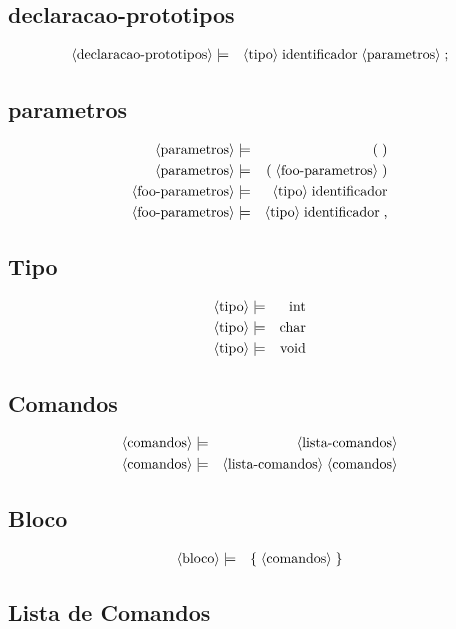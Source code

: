 \documentclass[12pt,a4papper]{article}
\newcommand{\pn}[1]{\langle \textnormal{#1} \rangle}
\newcommand{\pp}{\models}
\newcommand{\ww}{\;}
\newcommand{\sm}[1]{\textnormal{#1}}
\begin{document}
\begin{landscape}
\subsection{declaracao-prototipos}
\begin{eqnarray}
\pn{declaracao-prototipos} &\pp& \pn{tipo} \ww \sm{identificador} \ww \pn{parametros} \ww \sm{;}
\end{eqnarray}


\subsection{parametros}
\begin{eqnarray}
\pn{parametros} &\pp& \sm{(} \ww \sm{)} \\
\pn{parametros} &\pp& \sm{(} \ww \pn{foo-parametros} \ww \sm{)} \\
\pn{foo-parametros} &\pp& \pn{tipo} \ww \sm{identificador} \\
\pn{foo-parametros} &\pp& \pn{tipo} \ww \sm{identificador} \ww \sm{,} 
\end{eqnarray}


\subsection{Tipo}
\begin{eqnarray}
        \pn{tipo} &\pp& \sm{int} \\
        \pn{tipo} &\pp& \sm{char} \\
        \pn{tipo} &\pp& \sm{void} 
\end{eqnarray}


\subsection{Comandos}
\begin{eqnarray}
\pn{comandos} &\pp& \pn{lista-comandos} \\
\pn{comandos} &\pp& \pn{lista-comandos} \ww \pn{comandos} 
\end{eqnarray}


\subsection{Bloco}
\begin{eqnarray}
        \pn{bloco} &\pp& \sm{\{} \ww \pn{comandos} \ww \sm{\}}
\end{eqnarray}


\subsection{Lista de Comandos}


\end{landscape}
\end{document}
